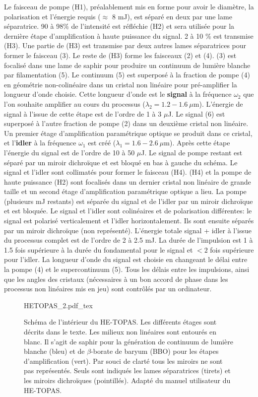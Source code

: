 Le faisceau de pompe (H1), préalablement mis en forme pour avoir le diamètre, la polarisation et l'énergie requis ($\approx$ 8 mJ), est séparé en deux par une lame séparatrice. 90 à 98\% de l'intensité est réfléchie (H2) et sera utilisée pour la dernière étape d'amplification à haute puissance du signal. 2 à 10 \% est transmise (H3). Une partie de (H3) est transmise par deux autres lames séparatrices pour former le faisceau (3). Le reste de (H3) forme les faisceaux (2) et (4). (3) est focalisé dans une lame de saphir pour produire un continuum de lumière blanche par filamentation (5). Le continuum (5) est superposé à la fraction de pompe (4) en géométrie non-colinéaire dans un cristal non linéaire pour pré-amplifier la longueur d'onde choisie. Cette longueur d'onde est le \textbf{signal} à la fréquence $\omega_2$ que l'on souhaite amplifier au cours du processus ($\lambda_2 = 1.2 - 1.6 \: \mu$m). L'énergie de signal à l'issue de cette étape est de l'ordre de 1 à 3 $\mu$J. Le signal (6) est superposé à l'autre fraction de pompe (2) dans un deuxième cristal non linéaire. Un premier étage d'amplification paramétrique optique se produit dans ce cristal, et l'\textbf{idler} à la fréquence $\omega_1$ est créé ($\lambda_1 = 1.6 - 2.6 \: \mu$m). Après cette étape l'énergie du signal est de l'ordre de 10 à 50 $\mu$J. Le signal de pompe restant est séparé par un miroir dichroïque et est bloqué en bas à gauche du schéma. Le signal et l'idler sont collimatés pour former le faisceau (H4). (H4) et la pompe de haute puissance (H2) sont focalisés dans un dernier cristal non linéaire de grande taille et un second étage d'amplification paramétrique optique a lieu. La pompe (plusieurs mJ restants) est séparée du signal et de l'idler par un miroir dichroïque et est bloquée. Le signal et l'idler sont colinéaires et de polarisation différentes: le signal est polarisé verticalement et l'idler horizontalement. Ils sont ensuite séparés par un miroir dichroïque (non représenté). L'énergie totale signal + idler à l'issue du processus complet est de l'ordre de 2 à 2.5 mJ. La durée de l'impulsion est 1 à 1.5 fois supérieure à la durée du fondamental pour le signal et $< 2$ fois supérieure pour l'idler. La longueur d'onde du signal est choisie en changeant le délai entre la pompe (4) et le supercontinuum (5). Tous les délais entre les impulsions, ainsi que les angles des cristaux (nécessaires à un bon accord de phase dans les processus non linéaires mis en jeu) sont contrôlés par un ordinateur.

\begin{figure}
\centering
\def\svgwidth{\columnwidth}
{HETOPAS_2.pdf_tex}
\caption{Schéma de l'intérieur du HE-TOPAS. Les différents étages sont décrits dans le texte. Les milieux non linéaires sont entourés en blanc. Il s'agit de saphir pour la génération de continuum de lumière blanche (bleu) et de $\beta$-borate de baryum (BBO) pour les étapes d'amplification (vert). Par souci de clarté tous les miroirs ne sont pas représentés. Seuls sont indiqués les lames séparatrices (tirets) et les miroirs dichroïques (pointillés). Adapté du manuel utilisateur du HE-TOPAS.}
\label{fig:HETOPAS}
\end{figure}


